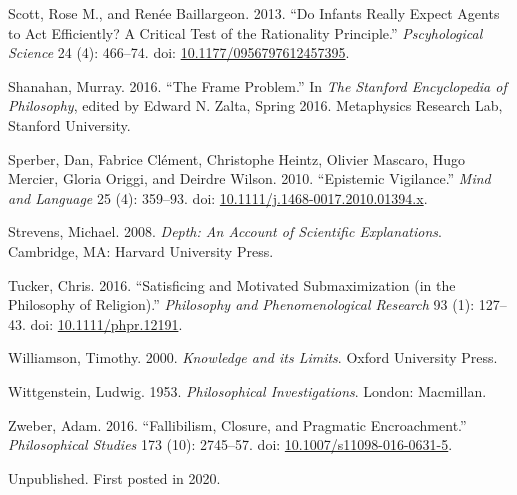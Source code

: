\documentclass[
  10pt,
  letterpaper,
  DIV=11,
  numbers=noendperiod,
  twoside]{scrartcl}
\newlength{\cslhangindent}
\newenvironment{CSLReferences}[2] %
 {\begin{list}{}{%
  \setlength{\itemindent}{0pt}
  \setlength{\leftmargin}{0pt}
  \setlength{\parsep}{0pt}
  \ifodd #1
   \setlength{\leftmargin}{\cslhangindent}
   \setlength{\itemindent}{-1\cslhangindent}
  \fi
  \setlength{\itemsep}{#2\baselineskip}}}
 {\end{list}}
\begin{document}
\begin{CSLReferences}{1}{0}
Scott, Rose M., and Renée Baillargeon. 2013. {``Do Infants Really Expect
Agents to Act Efficiently? A Critical Test of the Rationality
Principle.''} \emph{Pscyhological Science} 24 (4): 466--74. doi:
\href{https://doi.org/10.1177/0956797612457395}{10.1177/0956797612457395}.

Shanahan, Murray. 2016. {``The Frame Problem.''} In \emph{The Stanford
Encyclopedia of Philosophy}, edited by Edward N. Zalta, Spring 2016.
Metaphysics Research Lab, Stanford University.

Sperber, Dan, Fabrice Clément, Christophe Heintz, Olivier Mascaro, Hugo
Mercier, Gloria Origgi, and Deirdre Wilson. 2010. {``Epistemic
Vigilance.''} \emph{Mind and Language} 25 (4): 359--93. doi:
\href{https://doi.org/10.1111/j.1468-0017.2010.01394.x}{10.1111/j.1468-0017.2010.01394.x}.

Strevens, Michael. 2008. \emph{Depth: An Account of Scientific
Explanations}. Cambridge, MA: Harvard University Press.

Tucker, Chris. 2016. {``Satisficing and Motivated Submaximization (in
the Philosophy of Religion).''} \emph{Philosophy and Phenomenological
Research} 93 (1): 127--43. doi:
\href{https://doi.org/10.1111/phpr.12191}{10.1111/phpr.12191}.

Williamson, Timothy. 2000. \emph{{Knowledge and its Limits}}. Oxford
University Press.

Wittgenstein, Ludwig. 1953. \emph{Philosophical Investigations}. London:
Macmillan.

Zweber, Adam. 2016. {``Fallibilism, Closure, and Pragmatic
Encroachment.''} \emph{Philosophical Studies} 173 (10): 2745--57. doi:
\href{https://doi.org/10.1007/s11098-016-0631-5}{10.1007/s11098-016-0631-5}.

\end{CSLReferences}



\noindent Unpublished. First posted in 2020.
\end{document}
